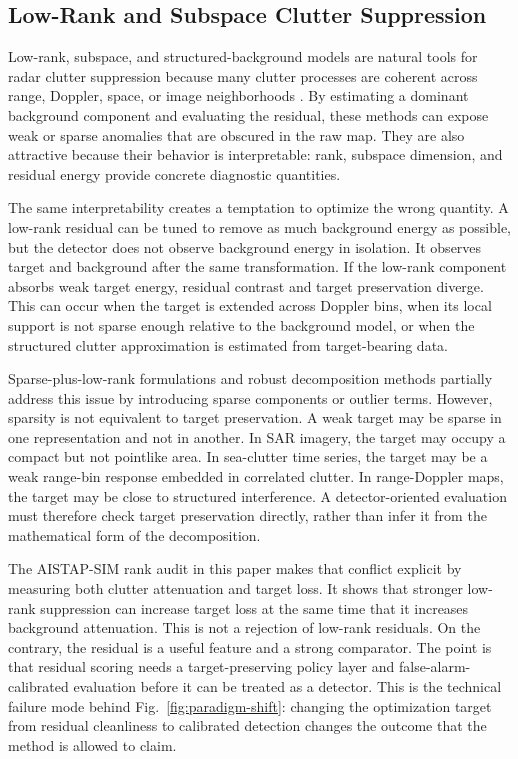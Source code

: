 \documentclass[journal]{IEEEtran}
\begin{document}
\subsection{Low-Rank and Subspace Clutter Suppression}

Low-rank, subspace, and structured-background models are natural tools for radar clutter suppression because many clutter processes are coherent across range, Doppler, space, or image neighborhoods \cite{candes2011rpca,vaswani2018robustsubspace}. By estimating a dominant background component and evaluating the residual, these methods can expose weak or sparse anomalies that are obscured in the raw map. They are also attractive because their behavior is interpretable: rank, subspace dimension, and residual energy provide concrete diagnostic quantities.

The same interpretability creates a temptation to optimize the wrong quantity. A low-rank residual can be tuned to remove as much background energy as possible, but the detector does not observe background energy in isolation. It observes target and background after the same transformation. If the low-rank component absorbs weak target energy, residual contrast and target preservation diverge. This can occur when the target is extended across Doppler bins, when its local support is not sparse enough relative to the background model, or when the structured clutter approximation is estimated from target-bearing data.

Sparse-plus-low-rank formulations and robust decomposition methods partially address this issue by introducing sparse components or outlier terms. However, sparsity is not equivalent to target preservation. A weak target may be sparse in one representation and not in another. In SAR imagery, the target may occupy a compact but not pointlike area. In sea-clutter time series, the target may be a weak range-bin response embedded in correlated clutter. In range-Doppler maps, the target may be close to structured interference. A detector-oriented evaluation must therefore check target preservation directly, rather than infer it from the mathematical form of the decomposition.

The AISTAP-SIM rank audit in this paper makes that conflict explicit by measuring both clutter attenuation and target loss. It shows that stronger low-rank suppression can increase target loss at the same time that it increases background attenuation. This is not a rejection of low-rank residuals. On the contrary, the residual is a useful feature and a strong comparator. The point is that residual scoring needs a target-preserving policy layer and false-alarm-calibrated evaluation before it can be treated as a detector. This is the technical failure mode behind Fig.~\ref{fig:paradigm-shift}: changing the optimization target from residual cleanliness to calibrated detection changes the outcome that the method is allowed to claim.
\end{document}
